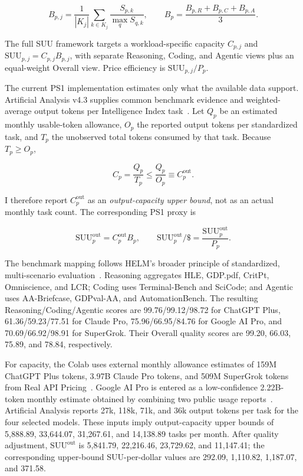\documentclass[sigconf,nonacm]{acmart}
\begin{document}
\[
B_{p,j}
=
\frac{1}{|K_j|}
\sum_{k\in K_j}
\frac{S_{p,k}}{\max_q S_{q,k}},
\qquad
B_p=\frac{B_{p,R}+B_{p,C}+B_{p,A}}{3}.
\]

The full SUU framework targets a workload-specific capacity $C_{p,j}$ and
$\mathrm{SUU}_{p,j}=C_{p,j}B_{p,j}$, with separate Reasoning, Coding, and
Agentic views plus an equal-weight Overall view. Price efficiency is
$\mathrm{SUU}_{p,j}/P_p$.

The current PS1 implementation estimates only what the available data support.
Artificial Analysis v4.3 supplies common benchmark evidence and weighted-average
output tokens per Intelligence Index task~\cite{aa2026}. Let $Q_p$ be an
estimated monthly usable-token allowance, $O_p$ the reported output tokens per
standardized task, and $T_p$ the unobserved total tokens consumed by that task.
Because $T_p\ge O_p$,

\[
C_p=\frac{Q_p}{T_p}
\le
\frac{Q_p}{O_p}
\equiv C_p^{\mathrm{out}}.
\]

I therefore report $C_p^{\mathrm{out}}$ as an \emph{output-capacity upper
bound}, not as an actual monthly task count. The corresponding PS1 proxy is

\[
\mathrm{SUU}^{\mathrm{out}}_p=C_p^{\mathrm{out}}B_p,
\qquad
\mathrm{SUU}^{\mathrm{out}}_p/\$=
\frac{\mathrm{SUU}^{\mathrm{out}}_p}{P_p}.
\]

The benchmark mapping follows HELM's broader principle of standardized,
multi-scenario evaluation~\cite{bommasani2023}. Reasoning aggregates HLE,
GDP.pdf, CritPt, Omniscience, and LCR; Coding uses Terminal-Bench and SciCode;
and Agentic uses AA-Briefcase, GDPval-AA, and AutomationBench. The resulting
Reasoning/Coding/Agentic scores are 99.76/99.12/98.72 for ChatGPT Plus,
61.36/59.23/77.51 for Claude Pro, 75.96/66.95/84.76 for Google AI Pro, and
70.69/66.92/98.91 for SuperGrok. Their Overall quality scores are 99.20,
66.03, 75.89, and 78.84, respectively.

For capacity, the Colab uses external monthly allowance estimates of 159M
ChatGPT Plus tokens, 3.97B Claude Pro tokens, and 509M SuperGrok tokens from
Real API Pricing~\cite{realapi2026}. Google AI Pro is entered as a
low-confidence 2.22B-token monthly estimate obtained by combining two public
usage reports~\cite{googlequota2026,googleweekly2026}. Artificial Analysis
reports 27k, 118k, 71k, and 36k output tokens per task for the four selected
models. These inputs imply output-capacity upper bounds of 5,888.89,
33,644.07, 31,267.61, and 14,138.89 tasks per month. After quality adjustment,
$\mathrm{SUU}^{\mathrm{out}}$ is 5,841.79, 22,216.46, 23,729.62, and 11,147.41;
the corresponding upper-bound SUU-per-dollar values are 292.09, 1,110.82,
1,187.07, and 371.58.
\end{document}
